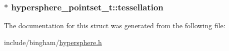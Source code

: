 \label{structhypersphere__pointset__t_a3930068cd0836f339792ee59840b1713}
\hypertarget{structhypersphere__pointset__t_ab8386b250d4bfe0e7738c662c414c59f}{
\subsubsection[{tessellation}]{$\ast$ {\bf hypersphere\_\-pointset\_\-t::tessellation}}}
\label{structhypersphere__pointset__t_ab8386b250d4bfe0e7738c662c414c59f}


The documentation for this struct was generated from the following file:\begin{DoxyCompactItemize}
\item 
include/bingham/\hyperlink{hypersphere_8h}{hypersphere.h}\end{DoxyCompactItemize}
